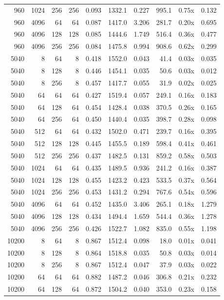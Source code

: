 {\begin{longtable}{rrrrrrrrrr}
960 & 1024 & 256 & 256 & 0.093 & 1332.1 & 0.227 & 995.1 & 0.75x & 0.132\\
960 & 4096 & 64 & 64 & 0.087 & 1417.0 & 3.206 & 281.7 & 0.20x & 0.695\\
960 & 4096 & 128 & 128 & 0.085 & 1444.6 & 1.749 & 516.4 & 0.36x & 0.477\\
960 & 4096 & 256 & 256 & 0.084 & 1475.8 & 0.994 & 908.6 & 0.62x & 0.299\\
5040 & 8 & 64 & 8 & 0.418 & 1552.0 & 0.043 & 41.4 & 0.03x & 0.035\\
5040 & 8 & 128 & 8 & 0.446 & 1454.1 & 0.035 & 50.6 & 0.03x & 0.012\\
5040 & 8 & 256 & 8 & 0.457 & 1417.7 & 0.055 & 31.9 & 0.02x & 0.025\\
5040 & 64 & 64 & 64 & 0.427 & 1519.4 & 0.057 & 249.1 & 0.16x & 0.183\\
5040 & 64 & 128 & 64 & 0.454 & 1428.4 & 0.038 & 370.5 & 0.26x & 0.165\\
5040 & 64 & 256 & 64 & 0.450 & 1440.4 & 0.035 & 398.7 & 0.28x & 0.098\\
5040 & 512 & 64 & 64 & 0.432 & 1502.0 & 0.471 & 239.7 & 0.16x & 0.395\\
5040 & 512 & 128 & 128 & 0.445 & 1455.5 & 0.189 & 598.4 & 0.41x & 0.461\\
5040 & 512 & 256 & 256 & 0.437 & 1482.5 & 0.131 & 859.2 & 0.58x & 0.503\\
5040 & 1024 & 64 & 64 & 0.435 & 1489.5 & 0.936 & 241.2 & 0.16x & 0.387\\
5040 & 1024 & 128 & 128 & 0.455 & 1423.2 & 0.423 & 533.5 & 0.37x & 0.564\\
5040 & 1024 & 256 & 256 & 0.453 & 1431.2 & 0.294 & 767.6 & 0.54x & 0.596\\
5040 & 4096 & 64 & 64 & 0.452 & 1435.0 & 3.406 & 265.1 & 0.18x & 1.279\\
5040 & 4096 & 128 & 128 & 0.434 & 1494.4 & 1.659 & 544.4 & 0.36x & 1.278\\
5040 & 4096 & 256 & 256 & 0.426 & 1522.7 & 1.082 & 835.0 & 0.55x & 1.198\\
10200 & 8 & 64 & 8 & 0.867 & 1512.4 & 0.098 & 18.0 & 0.01x & 0.041\\
10200 & 8 & 128 & 8 & 0.864 & 1518.8 & 0.035 & 50.8 & 0.03x & 0.014\\
10200 & 8 & 256 & 8 & 0.867 & 1512.4 & 0.047 & 37.9 & 0.03x & 0.022\\
10200 & 64 & 64 & 64 & 0.882 & 1487.2 & 0.046 & 306.8 & 0.21x & 0.232\\
10200 & 64 & 128 & 64 & 0.872 & 1504.2 & 0.040 & 353.0 & 0.23x & 0.158\\

\end{longtable}}

